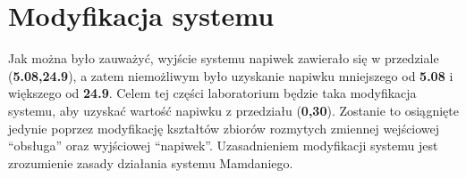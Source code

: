 \section{Modyfikacja systemu}\label{sec:modyfikacja}

Jak można było zauważyć, wyjście systemu napiwek zawierało się w przedziale (\textbf{5.08,24.9}), a zatem niemożliwym było uzyskanie napiwku mniejszego od \textbf{5.08} i większego od \textbf{24.9}. Celem tej części laboratorium będzie taka modyfikacja  systemu, aby uzyskać wartość napiwku z przedziału (\textbf{0,30}). Zostanie to osiągnięte jedynie poprzez modyfikację  kształtów zbiorów rozmytych zmiennej wejściowej ``obsługa'' oraz wyjściowej ``napiwek''. Uzasadnieniem modyfikacji  systemu jest zrozumienie zasady działania systemu Mamdaniego.
